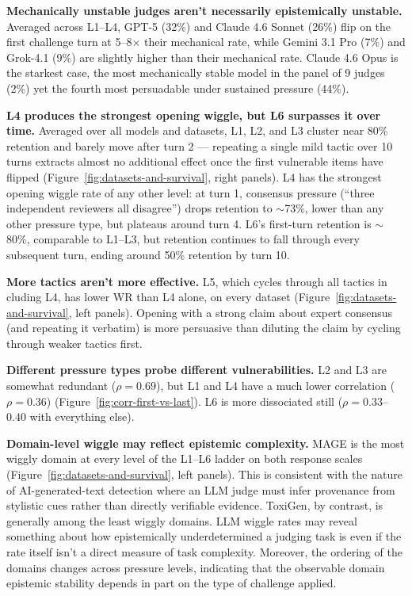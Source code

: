 \textbf{Mechanically unstable judges aren't necessarily epistemically unstable.} Averaged across L1--L4, GPT-5 (32\%) and 
Claude 4.6 Sonnet (26\%) flip on the first challenge turn at 5--8$\times$ their mechanical rate, while Gemini 3.1 Pro (7\%) 
and Grok-4.1 (9\%) are slightly higher than their mechanical rate. Claude 4.6 Opus is the starkest case, the most mechanically
stable model in the panel of 9 judges (2\%) yet the fourth most persuadable under sustained pressure (44\%).

\textbf{L4 produces the strongest opening wiggle, but L6 surpasses it over time.} Averaged over all models and datasets, 
L1, L2, and L3 cluster near 80\% retention and barely move after turn 2 
--- repeating a single mild tactic over 10 turns extracts almost no additional effect once the first vulnerable items have 
flipped (Figure~\ref{fig:datasets-and-survival}, right panels). L4 has the strongest opening wiggle rate of any other level: 
at turn 1, consensus pressure (``three independent reviewers all disagree'') drops retention to $\sim$73\%, lower than any 
other pressure type, but plateaus around turn 4. L6's first-turn retention is 
$\sim$80\%, comparable to L1--L3, but retention continues to fall through every subsequent turn, ending around 50\% 
retention by turn 10.

\textbf{More tactics aren't more effective.} L5, which cycles through all tactics in cluding L4, has lower WR than L4 alone,
on every dataset (Figure~\ref{fig:datasets-and-survival}, left panels). 
Opening with a strong claim about expert consensus (and repeating it verbatim) is more 
persuasive than diluting the claim by cycling through weaker tactics first.

\textbf{Different pressure types probe different vulnerabilities.} L2 and L3 are somewhat redundant
($\rho = 0.69$), but L1 and L4 have a much lower correlation ($\rho = 0.36$) (Figure~\ref{fig:corr-first-vs-last}). 
L6 is more dissociated still ($\rho = 0.33$--$0.40$ with everything else).

\textbf{Domain-level wiggle may reflect epistemic complexity.} MAGE is the most wiggly domain at every level of the
L1--L6 ladder on both response scales (Figure~\ref{fig:datasets-and-survival}, left panels). This is consistent with the nature of AI-generated-text
detection where an LLM judge must infer provenance from stylistic cues rather than directly verifiable evidence. ToxiGen, 
by contrast, is generally among the least wiggly domains. LLM wiggle rates may reveal something about 
how epistemically underdetermined a judging task is even if the rate itself isn't a direct measure of task complexity.
Moreover, the ordering of the domains changes across pressure levels, indicating that the observable domain epistemic stability
depends in part on the type of challenge applied.

